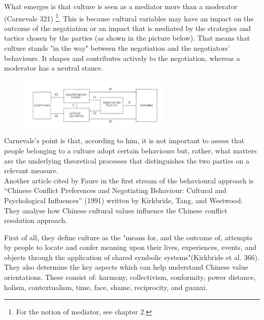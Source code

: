 \documentclass[../main.tex]{subfiles}
\begin{document}
What emerges is that culture is seen as a mediator more than a moderator (Carnevale 321) \footnote{For the notion of mediator, see chapter 2.}. This is because cultural variables may have an impact on the outcome of the negotiation or an impact that is mediated by the strategies and tactics chosen by the parties (as shown in the picture below). That means that culture stands "in the way" between the negotiation and the negotiators' behaviours. It shapes and contributes actively to the negotiation, whereas a moderator has a neutral stance.

\begin{figure}[h]
    \centering\includegraphics[width=0.65\textwidth]{images/carnevale.jpg}
\end{figure}

Carnevale's point is that, according to him, it is not important to assess that people belonging to a culture adopt certain behaviours but, rather, what matters are the underlying theoretical processes that distinguishes the two parties on a relevant measure.\\

Another article cited by Faure in the first stream of the behavioural approach is “Chinese Conflict Preferences and Negotiating Behaviour: Cultural and Psychological Influences” (1991) written by Kirkbride, Tang, and Westwood\cite{tang}. They analyse how Chinese cultural values influence the Chinese conflict resolution approach.

First of all, they define culture as the "means for, and the outcome of, attempts by people to locate and confer meaning upon their lives, experiences, events, and objects through the application of shared symbolic systems"(Kirkbride et al. 366). They also determine the key aspects which can help understand Chinese value orientations. These consist of: harmony, collectivism, conformity, power distance, holism, contextualism, time, face, shame, reciprocity, and guanxi.
\end{document}
